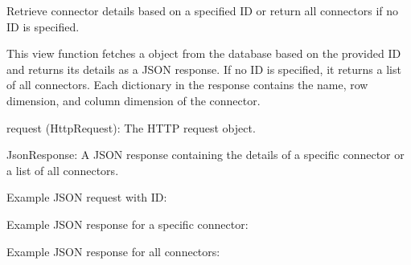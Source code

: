 \documentclass[letterpaper,10pt,english]{sphinxmanual}
\begin{document}
\begin{fulllineitems}
\label{\detokenize{app:app.views.get_connector}}
\pysigstartsignatures
{}
\pysigstopsignatures
\sphinxAtStartPar
Retrieve connector details based on a specified ID or return all connectors if no ID is specified.

\sphinxAtStartPar
This view function fetches a  object from the database based on the provided 
ID and returns its details as a JSON response. If no ID is specified, it returns a list 
of all connectors. Each dictionary in the response contains the name, row dimension, 
and column dimension of the connector.
\begin{description}
\sphinxAtStartPar
request (HttpRequest): The HTTP request object.

\sphinxAtStartPar
JsonResponse: A JSON response containing the details of a specific connector or 
a list of all connectors.

\sphinxAtStartPar
Example JSON request with ID:

\begin{sphinxVerbatim}[commandchars=\\\{\}]
  
\end{sphinxVerbatim}

\sphinxAtStartPar
Example JSON response for a specific connector:

\begin{sphinxVerbatim}[commandchars=\\\{\}]
\end{sphinxVerbatim}

\sphinxAtStartPar
Example JSON response for all connectors:


\end{description}
\end{fulllineitems}
\end{document}
